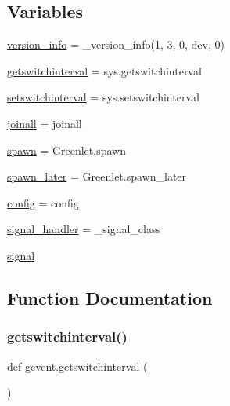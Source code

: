 \subsection*{Variables}
\begin{DoxyCompactItemize}
\item 
\hyperlink{namespacegevent_a03b02b5a1aefb0e7023097fc8f1f2df1}{version\+\_\+info} = \+\_\+version\+\_\+info(1, 3, 0, \textquotesingle{}dev\textquotesingle{}, 0)
\item 
\hyperlink{namespacegevent_aecd468f27809b4afd03c3b47d75c0d3c}{getswitchinterval} = sys.\+getswitchinterval
\item 
\hyperlink{namespacegevent_a9358b3d1f578a2015e93af9fc5fbf958}{setswitchinterval} = sys.\+setswitchinterval
\item 
\hyperlink{namespacegevent_ad2ce15549888c998fe4d787fbd03980d}{joinall} = joinall
\item 
\hyperlink{namespacegevent_a9720a4db7f184a9d853e14f0012b6127}{spawn} = Greenlet.\+spawn
\item 
\hyperlink{namespacegevent_a3324c17d06a81c228e855b4889114fd9}{spawn\+\_\+later} = Greenlet.\+spawn\+\_\+later
\item 
\hyperlink{namespacegevent_ad7288336e1af82c69347b25654ae63a4}{config} = config
\item 
\hyperlink{namespacegevent_a1500f5afa15470df950ecb9c0c4e91cd}{signal\+\_\+handler} = \+\_\+signal\+\_\+class
\item 
\hyperlink{namespacegevent_a4f81fc50ce55186f9ed9f291c8c1c345}{signal}
\end{DoxyCompactItemize}


\subsection{Function Documentation}
\mbox{\label{namespacegevent_a13b200a3100c5b916ff019ebbf5ec8cf}} 
\subsubsection{\texorpdfstring{getswitchinterval()}{getswitchinterval()}}
{\footnotesize\ttfamily def gevent.\+getswitchinterval (\begin{DoxyParamCaption}{ }\end{DoxyParamCaption})}

